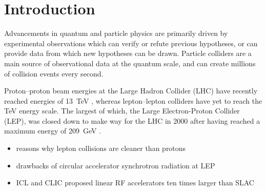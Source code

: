 
\section{Introduction}

Advancements in quantum and particle physics are primarily driven by
experimental observations which can verify or refute previous hypotheses, or
can provide data from which new hypotheses can be drawn. 
Particle colliders are a main source of observational data at the quantum
scale, and can create millions of collision events every second.


Proton--proton beam energies at the Large Hadron Collider (LHC) have recently
reached energies of \SI{13}{\tera\electronvolt} \cite{o2015first}, whereas
lepton--lepton colliders have yet to reach the \si{\tera\electronvolt} energy
scale. The largest of which, the Large Electron-Proton Collider (LEP), was
closed down to make way for the LHC in \num{2000} after having reached a
maximum energy of \SI{209}{\giga\electronvolt} \cite{Barate2003sz}.

\begin{itemize}
	\item reasons why lepton collisions are cleaner than protons
	\item drawbacks of circular accelerator synchrotron radiation at LEP
		\cite{Brandt2000xk}
	\item ICL and CLIC proposed linear RF accelerators ten times larger
		than SLAC
\end{itemize}



